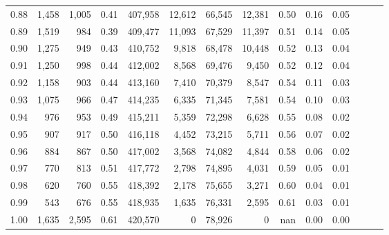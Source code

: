\begin{tabular}{rrrrrrrrrrrrrr}
0.88 &   1,458 &  1,005 &  0.41 &  407,958 &   12,612 &  66,545 &  12,381 &  0.50 &  0.16 &      0.05 \\
0.89 &   1,519 &    984 &  0.39 &  409,477 &   11,093 &  67,529 &  11,397 &  0.51 &  0.14 &      0.05 \\
0.90 &   1,275 &    949 &  0.43 &  410,752 &    9,818 &  68,478 &  10,448 &  0.52 &  0.13 &      0.04 \\
0.91 &   1,250 &    998 &  0.44 &  412,002 &    8,568 &  69,476 &   9,450 &  0.52 &  0.12 &      0.04 \\
0.92 &   1,158 &    903 &  0.44 &  413,160 &    7,410 &  70,379 &   8,547 &  0.54 &  0.11 &      0.03 \\
0.93 &   1,075 &    966 &  0.47 &  414,235 &    6,335 &  71,345 &   7,581 &  0.54 &  0.10 &      0.03 \\
0.94 &     976 &    953 &  0.49 &  415,211 &    5,359 &  72,298 &   6,628 &  0.55 &  0.08 &      0.02 \\
0.95 &     907 &    917 &  0.50 &  416,118 &    4,452 &  73,215 &   5,711 &  0.56 &  0.07 &      0.02 \\
0.96 &     884 &    867 &  0.50 &  417,002 &    3,568 &  74,082 &   4,844 &  0.58 &  0.06 &      0.02 \\
0.97 &     770 &    813 &  0.51 &  417,772 &    2,798 &  74,895 &   4,031 &  0.59 &  0.05 &      0.01 \\
0.98 &     620 &    760 &  0.55 &  418,392 &    2,178 &  75,655 &   3,271 &  0.60 &  0.04 &      0.01 \\
0.99 &     543 &    676 &  0.55 &  418,935 &    1,635 &  76,331 &   2,595 &  0.61 &  0.03 &      0.01 \\
1.00 &   1,635 &  2,595 &  0.61 &  420,570 &        0 &  78,926 &       0 &   nan &  0.00 &      0.00 \\
\bottomrule
\end{tabular}
